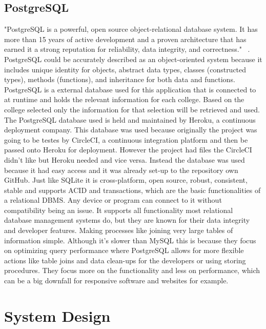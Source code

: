 \section{PostgreSQL}
"PostgreSQL is a powerful, open source object-relational database system. It has more than 15 years of active development and a proven architecture that has earned it a strong reputation for reliability, data integrity, and correctness." ~\cite{postgres}. PostgreSQL could be accurately described as an object-oriented system because it includes unique identity for objects, abstract data types, classes (constructed types), methods (functions), and inheritance for both data and functions. PostgreSQL is a external database used for this application that is connected to at runtime and holds the relevant information for each college. Based on the college selected only the information for that selection will be retrieved and used. The PostgreSQL database used is held and maintained by Heroku, a continuous deployment company. This database was used because originally the project was going to be testes by CircleCI, a continuous integration platform and then be passed onto Heroku for deployment. However the project had files the CircleCI didn't like but Heroku needed and vice versa. Instead the database was used because it had easy access and it was already set-up to the repository own GitHub. Just like SQLite it is cross-platform, open source, robust, consistent, stable and supports ACID and transactions, which are the basic functionalities of a relational DBMS. Any device or program can connect to it without compatibility being an issue. It supports all functionality most relational database management systems do, but they are known for their data integrity and developer features. Making processes like joining very large tables of information simple. Although it's slower than MySQL this is because they focus on optimizing query performance where PostgreSQL allows for more flexible actions like table joins and data clean-ups for the developers or using storing procedures. They focus more on the functionality and less on performance, which can be a big downfall for responsive software and websites for example.

\chapter{System Design}
